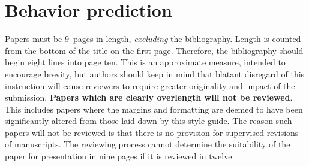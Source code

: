 \documentclass{bmvc2k}
\begin{document}

\section{Behavior prediction}
\label{sec:steering}
Papers must be 9~pages in length, {\em excluding} the bibliography.  Length
is counted from the bottom of the title on the first page.  Therefore, the
bibliography should begin eight lines into page ten.  This is an
approximate measure, intended to encourage brevity, but authors should keep
in mind that blatant disregard of this instruction will cause reviewers to
require greater originality and impact of the submission.  {\bf Papers which are
clearly overlength will not be reviewed}.  This includes papers where the
margins and formatting are deemed to have been significantly altered from
those laid down by this style guide.  The reason such papers will not be
reviewed is that there is no provision for supervised revisions of
manuscripts.  The reviewing process cannot determine the suitability of the
paper for presentation in nine pages if it is reviewed in twelve.

\end{document}
